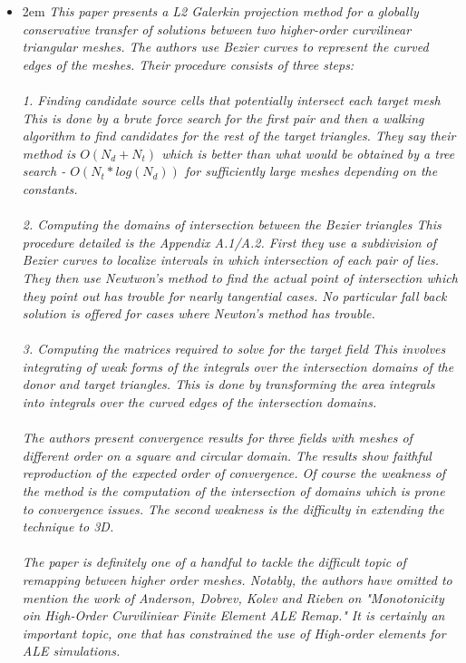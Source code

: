 \documentclass{letter}
\renewcommand{\rq}[1]{\begin{addmargin}[2em]{2em}
\it
#1
\end{addmargin}\vspace{12pt}}
\begin{document}
\begin{letter}{}
\begin{itemize}
\item \rq{This paper presents a L2 Galerkin projection method for a globally conservative transfer of solutions between two higher-order curvilinear triangular meshes. The authors use Bezier curves to represent the curved edges of the meshes. Their procedure consists of three steps: \\
\ \\
1. Finding candidate source cells that potentially intersect each target mesh
  This is done by a brute force search for the first pair and then a walking
  algorithm to find candidates for the rest of the target triangles. They
  say their method is $O(N_d + N_t)$ which is better than what would be obtained
  by a tree search - $O(N_t*log(N_d))$ for sufficiently large meshes depending on
  the constants.\\
\ \\
2. Computing the domains of intersection between the Bezier triangles
  This procedure detailed is the Appendix A.1/A.2. First they use a subdivision
  of Bezier curves to localize intervals in which intersection of each pair of
  lies. They then use Newtwon's method to find the actual point of intersection
  which they point out has trouble for nearly tangential cases. No particular
  fall back solution is offered for cases where Newton's method has trouble.\\
\ \\
3. Computing the matrices required to solve for the target field
   This involves integrating of weak forms of the integrals over the
   intersection domains of the donor and target triangles. This is done by
   transforming the area integrals into integrals over the curved edges of the
   intersection domains.\\
 \ \\
The authors present convergence results for three fields with meshes
of different order on a square and circular domain. The results show
faithful reproduction of the expected order of convergence. Of course
the weakness of the method is the computation of the intersection of
domains which is prone to convergence issues. The second weakness is
the difficulty in extending the technique to 3D. \\
\ \\
The paper is definitely one of a handful to tackle the difficult topic
of remapping between higher order meshes. Notably, the authors have
omitted to mention the work of Anderson, Dobrev, Kolev and Rieben on
"Monotonicity oin High-Order Curviliniear Finite Element ALE Remap."
It is certainly an important topic, one that has constrained the use
of High-order elements for ALE simulations.}


\end{itemize}
\end{letter}
\end{document}
